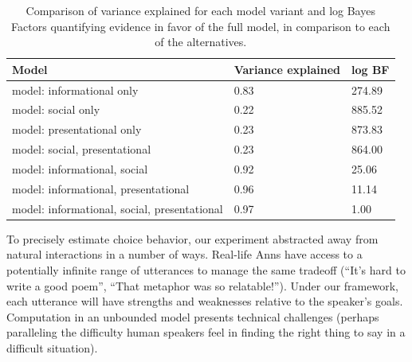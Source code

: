 \documentclass[12pt]{article}
\begin{document}
\begin{table}[tbp]
\begin{center}
\begin{threeparttable}
\caption{\label{tab:comparisonTable}Comparison of variance explained for each model variant and log Bayes Factors quantifying evidence in favor of the full model, in comparison to each of the alternatives.}
\begin{tabular}{lll}
\toprule
Model & \multicolumn{1}{c}{Variance
explained} & \multicolumn{1}{c}{log BF}\\
\midrule
model:
informational only & 0.83 & 274.89\\
model:
social only & 0.22 & 885.52\\
model:
presentational
only & 0.23 & 873.83\\
model:
social,
presentational & 0.23 & 864.00\\
model:
informational,
social & 0.92 & 25.06\\
model:
informational,
presentational & 0.96 & 11.14\\
model:
informational,
social,
presentational & 0.97 & 1.00\\
\bottomrule
\end{tabular}
\end{threeparttable}
\end{center}
\end{table}



To precisely estimate choice behavior, our experiment abstracted away from
natural interactions in a number of ways. Real-life Anns have access to a potentially infinite range of utterances to manage the same tradeoff (\enquote{It's hard to write a good poem}, \enquote{That
metaphor was so relatable!}). Under our framework, each utterance will have strengths and weaknesses relative to the speaker's goals. Computation in an unbounded model presents technical challenges \cite{goodman2016} (perhaps paralleling the difficulty human speakers feel in finding the right thing to say in a difficult situation).

\end{document}
